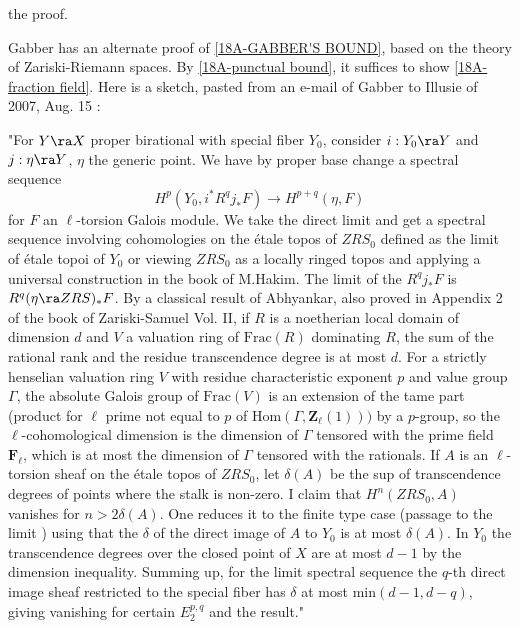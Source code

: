\documentclass[10pt]{../fichiers-configuration-latex/smfart}
\begin{document}
the proof.  \begin{remark} Gabber has an alternate proof of \ref{18A-GABBER'S BOUND}, based on the
theory of Zariski-Riemann spaces. By \ref{18A-punctual bound}, it suffices to show \ref{18A-fraction
field}. Here is a sketch, pasted from an e-mail of Gabber to Illusie of 2007, Aug. 15 :

\medskip "For $Y \ra X$ proper birational with special fiber $Y_0$, consider $i: Y_0 \ra Y$ and $j
: \eta \ra Y$, $\eta$ the generic point. We have by proper base change a spectral sequence $$
H^p(Y_0,i^*R^q j_*F) \rightarrow H^{p+q}(\eta,F) $$ for $F$ an $\ell$-torsion Galois module.  We
take the direct limit and get a spectral sequence involving cohomologies on the étale topos of
$ZRS_0$ defined as the limit of étale topoi of $Y_0$ or viewing $ZRS_0$ as a locally ringed topos
and applying a universal construction in the book of M.Hakim. The limit of the $R^q j_* F$ is $R^q
(\eta \ra ZRS)_* F$.  By a classical result of Abhyankar, also proved in Appendix 2 of the book of
Zariski-Samuel Vol. II, if $R$ is a noetherian local domain of dimension $d$ and $V$ a valuation
ring of $\mathrm{Frac}(R)$ dominating $R$, the sum of the rational rank and the residue
transcendence degree is at most $d$.  For a strictly henselian valuation ring  $V$ with residue
characteristic exponent $p$ and value group $\Gamma$, the absolute Galois group of
$\mathrm{Frac}(V)$ is an extension of the tame part (product for $\ell$ prime not equal to $p$ of
$\mathrm{Hom}(\Gamma, \mathbf{Z}_{\ell}(1)))$ by a $p$-group, so the $\ell$-cohomological dimension
is the dimension of $\Gamma$ tensored with the prime field $\mathbf{F}_{\ell}$, which is at most the
dimension of $\Gamma$ tensored with the rationals.  If $A$ is an $\ell$-torsion sheaf on the étale
topos of $ZRS_0$, let $\delta(A)$ be the sup of transcendence degrees of points where the stalk is
non-zero. I claim that $H^n(ZRS_0,A)$ vanishes for $n> 2 \delta(A)$. One reduces it to the finite
type case (passage to the limit )  using that the $\delta$ of the direct image of
$A$ to $Y_0$ is at most $\delta(A)$.  In $Y_0$ the transcendence degrees over the closed point of
$X$ are at most $d-1$ by the dimension inequality. Summing up, for the limit spectral sequence the
$q$-th  direct image sheaf  restricted to the special fiber has $\delta$ at most
$\mathrm{min}(d-1,d-q)$, giving vanishing for certain $E_2^{p,q}$ and the result." \end{remark}

\ifx\danslelivre\undefined


\end{document}

